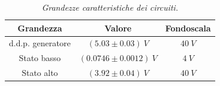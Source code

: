 \begin{table}[H]
  \centering
  \begin{tabular}[t]{c | c  c }
    \hline
    Grandezza & Valore & Fondoscala \\
    \hline
    d.d.p. generatore & $(5.03 \pm 0.03) \: V$ & $40 \: V$ \\
    Stato basso & $(0.0746 \pm 0.0012) \: V$ & $4 \: V$ \\
    Stato alto & $(3.92 \pm 0.04) \: V$ & $40 \: V$ \\
    \hline
  \end{tabular}
  \caption{\emph{Grandezze caratteristiche dei circuiti.}}
  \label{tab:livelli-logici}
\end{table}
